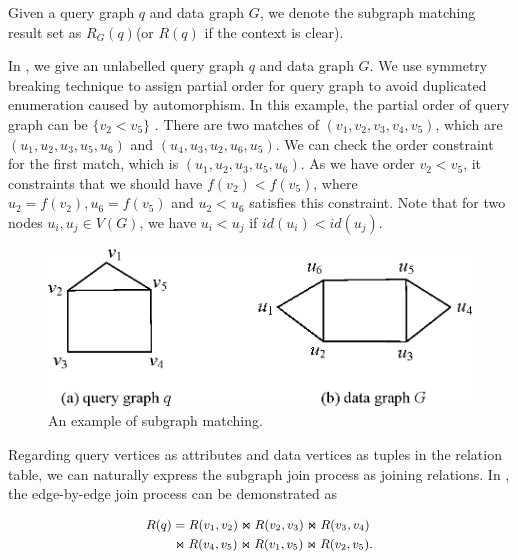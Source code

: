 Given a query graph $q$ and data graph $G$, we denote the subgraph matching result set as $R_G(q)$(or $R(q)$ if the context is clear). \\

\begin{example}
\label{ex:subgraph_isomorphism}	
In , we give an unlabelled query graph $q$ and data graph $G$. We use symmetry breaking technique\cite{Grochow2007} to assign partial order for query graph to avoid duplicated enumeration caused by automorphism. In this example, the partial order of query graph can be $\{v_2 < v_5\}$ . There are two matches of $(v_1, v_2, v_3, v_4, v_5)$, which are $(u_1, u_2, u_3, u_5, u_6)$ and $(u_4, u_3, u_2, u_6, u_5)$. We can check the order constraint for the first match, which is $(u_1, u_2, u_3, u_5, u_6)$. As we have order $v_2 < v_5$, it constraints that we should have $f(v_2) < f(v_5)$, where $u_2 = f(v_2), u_6 = f(v_5)$ and $u_2 < u_6$ satisfies this constraint. Note that for two nodes $u_i, u_j \in V(G)$, we have $u_i < u_j$ if $id(u_i) < id(u_j)$. 

\end{example}

\begin{figure}[htb]
  \centering
  \includegraphics[scale=0.6]{figures/subg.eps}
  \caption{\small{An example of subgraph matching.}}
  \label{fig:subgraph_isomorphism}
\end{figure}

Regarding query vertices as attributes and data vertices as tuples in the relation table, we can naturally express the subgraph join process as joining relations. In , the edge-by-edge join process can be demonstrated as

\begin{equation}
\label{eq:subgraph_isomorphism}
\small
\begin{aligned}
	R(q) &= R(v_1, v_2) \Join R(v_2, v_3) \Join R(v_3, v_4) \\ 	
	&\Join R(v_4, v_5) \Join R(v_1, v_5) \Join R(v_2, v_5).
\end{aligned}
\end{equation}

